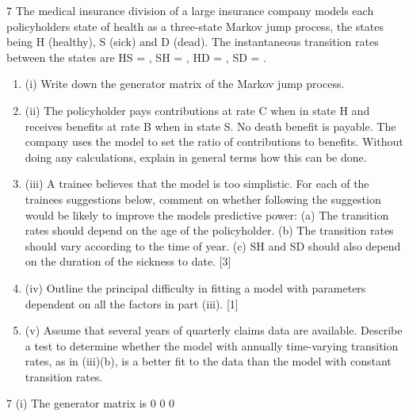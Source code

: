 \documentclass[a4paper,12pt]{article}
\begin{document}
7 The medical insurance division of a large insurance company models each
policyholders state of health as a three-state Markov jump process, the states being
H (healthy), S (sick) and D (dead). The instantaneous transition rates between the
states are HS = , SH = 
, HD = , SD = .

\begin{enumerate}
\item (i) Write down the generator matrix of the Markov jump process. 
\item (ii) The policyholder pays contributions at rate C when in state H and receives benefits at rate B when in state S. No death benefit is payable. The company uses the model to set the ratio of contributions to benefits. Without doing any calculations, explain in general terms how this can be done. 

\item (iii) A trainee believes that the model is too simplistic. For each of the trainees
suggestions below, comment on whether following the suggestion would be likely to improve the models predictive power:
(a) The transition rates should depend on the age of the policyholder.
(b) The transition rates should vary according to the time of year.
(c) SH and SD should also depend on the duration of the sickness to date.
[3]
\item (iv) Outline the principal difficulty in fitting a model with parameters dependent on all the factors in part (iii). [1]
\item (v) Assume that several years of quarterly claims data are available. Describe a test to determine whether the model with annually time-varying transition rates, as in (iii)(b), is a better fit to the data than the model with constant
transition rates.
\end{enumerate}
\newpage
7 (i) The generator matrix is
0 0 0
    
    	 	  
 
\end{document}
